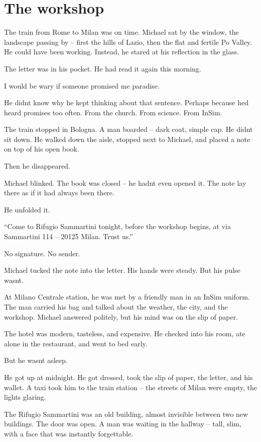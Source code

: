 \documentclass[
]{article}
\begin{document}
\section{The workshop}\label{the-workshop}

The train from Rome to Milan was on time. Michael sat by the window, the landscape passing by -- first the hills of Lazio, then the flat and fertile Po Valley. He could have been working. Instead, he stared at his reflection in the glass.

The letter was in his pocket. He had read it again this morning.

I would be wary if someone promised me paradise.

He didn\textquotesingle t know why he kept thinking about that sentence. Perhaps because he\textquotesingle d heard promises too often. From the church. From science. From InSim.

The train stopped in Bologna. A man boarded -- dark coat, simple cap. He didn\textquotesingle t sit down. He walked down the aisle, stopped next to Michael, and placed a note on top of his open book.

Then he disappeared.

Michael blinked. The book was closed -- he hadn\textquotesingle t even opened it. The note lay there as if it had always been there.

He unfolded it.

``Come to Rifugio Sammartini tonight, before the workshop begins, at via Sammartini 114 -- 20125 Milan. Trust us.''

No signature. No sender.

Michael tucked the note into the letter. His hands were steady. But his pulse wasn\textquotesingle t.

At Milano Centrale station, he was met by a friendly man in an InSim uniform. The man carried his bag and talked about the weather, the city, and the workshop. Michael answered politely, but his mind was on the slip of paper.

The hotel was modern, tasteless, and expensive. He checked into his room, ate alone in the restaurant, and went to bed early.

But he wasn\textquotesingle t asleep.

He got up at midnight. He got dressed, took the slip of paper, the letter, and his wallet. A taxi took him to the train station -- the streets of Milan were empty, the lights glaring.

The Rifugio Sammartini was an old building, almost invisible between two new buildings. The door was open. A man was waiting in the hallway -- tall, slim, with a face that was instantly forgettable.
\end{document}
